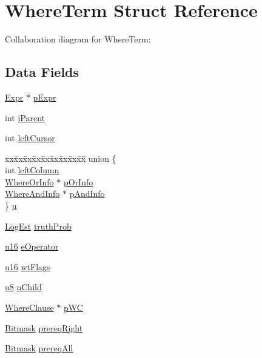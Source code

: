 \hypertarget{struct_where_term}{}\section{Where\+Term Struct Reference}
\label{struct_where_term}


Collaboration diagram for Where\+Term\+:
\subsection*{Data Fields}
\begin{DoxyCompactItemize}
\item 
\hyperlink{struct_expr}{Expr} $\ast$ \hyperlink{struct_where_term_aab4193f0accd02e4c2e5e60e105c03ca}{p\+Expr}
\item 
int \hyperlink{struct_where_term_a247cff41b07e5d14c9ba6650d89a0060}{i\+Parent}
\item 
int \hyperlink{struct_where_term_a5dfdebab7f5ce6a9e8c3985173ed6584}{left\+Cursor}
\item 
\begin{tabbing}
xx\=xx\=xx\=xx\=xx\=xx\=xx\=xx\=xx\=\kill
union \{\\
\>int \hyperlink{struct_where_term_afe35f80ea3d374f6d4c0e62e2153cae1}{leftColumn}\\
\>\hyperlink{struct_where_or_info}{WhereOrInfo} $\ast$ \hyperlink{struct_where_term_a233fab5761379ed04adf6c216578c81a}{pOrInfo}\\
\>\hyperlink{struct_where_and_info}{WhereAndInfo} $\ast$ \hyperlink{struct_where_term_a150360a9358431e4d53420fc0779a1c1}{pAndInfo}\\
\} \hyperlink{struct_where_term_a1afabdefa580020042ecaa0c1cc72ea7}{u}\\

\end{tabbing}\item 
\hyperlink{sqlite3_8c_aa0f9b3b63ad120ac15b96785b05ce733}{Log\+Est} \hyperlink{struct_where_term_ada1f7e88cbf8154b8f353eb87f753e95}{truth\+Prob}
\item 
\hyperlink{sqlite3_8c_a20f2299e322dcbde37cb07b16910b843}{u16} \hyperlink{struct_where_term_a695bfc96317aa1d79ee883b711da4bc3}{e\+Operator}
\item 
\hyperlink{sqlite3_8c_a20f2299e322dcbde37cb07b16910b843}{u16} \hyperlink{struct_where_term_a2fca16b07d01ffb5660833e875675401}{wt\+Flags}
\item 
\hyperlink{sqlite3_8c_a74a0f6424ae628af25f23f0a35f6ead3}{u8} \hyperlink{struct_where_term_ab94097e5c2844a5a1c3ec58e8acb9a3d}{n\+Child}
\item 
\hyperlink{struct_where_clause}{Where\+Clause} $\ast$ \hyperlink{struct_where_term_ab85657232a3c235326f1e0dd179e32b7}{p\+W\+C}
\item 
\hyperlink{sqlite3_8c_afa77b629897c4457bfdc47d364ba5c3f}{Bitmask} \hyperlink{struct_where_term_a327b0c75e6d1aabcd5ca7fafae1be2db}{prereq\+Right}
\item 
\hyperlink{sqlite3_8c_afa77b629897c4457bfdc47d364ba5c3f}{Bitmask} \hyperlink{struct_where_term_ae4bf473a378401a7052787c59b4a6e3a}{prereq\+All}
\end{DoxyCompactItemize}


